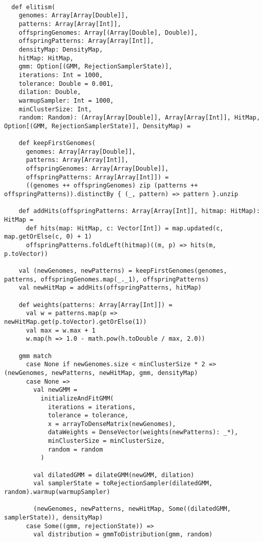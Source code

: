 \documentclass[10pt,a4paper]{article}
\theoremstyle{definition}
\theoremstyle{remark}
\begin{document}
\begin{lstlisting}[caption={Elitism function},label={lst:elitism}]

  def elitism(
    genomes: Array[Array[Double]],
    patterns: Array[Array[Int]],
    offspringGenomes: Array[(Array[Double], Double)],
    offspringPatterns: Array[Array[Int]],
    densityMap: DensityMap,
    hitMap: HitMap,
    gmm: Option[(GMM, RejectionSamplerState)],
    iterations: Int = 1000,
    tolerance: Double = 0.001,
    dilation: Double,
    warmupSampler: Int = 1000,
    minClusterSize: Int,
    random: Random): (Array[Array[Double]], Array[Array[Int]], HitMap, Option[(GMM, RejectionSamplerState)], DensityMap) =

    def keepFirstGenomes(
      genomes: Array[Array[Double]],
      patterns: Array[Array[Int]],
      offspringGenomes: Array[Array[Double]],
      offspringPatterns: Array[Array[Int]]) =
      ((genomes ++ offspringGenomes) zip (patterns ++ offspringPatterns)).distinctBy { (_, pattern) => pattern }.unzip

    def addHits(offspringPatterns: Array[Array[Int]], hitmap: HitMap): HitMap =
      def hits(map: HitMap, c: Vector[Int]) = map.updated(c, map.getOrElse(c, 0) + 1)
      offspringPatterns.foldLeft(hitmap)((m, p) => hits(m, p.toVector))

    val (newGenomes, newPatterns) = keepFirstGenomes(genomes, patterns, offspringGenomes.map(_._1), offspringPatterns)
    val newHitMap = addHits(offspringPatterns, hitMap)

    def weights(patterns: Array[Array[Int]]) =
      val w = patterns.map(p => newHitMap.get(p.toVector).getOrElse(1))
      val max = w.max + 1
      w.map(h => 1.0 - math.pow(h.toDouble / max, 2.0))

    gmm match
      case None if newGenomes.size < minClusterSize * 2 => (newGenomes, newPatterns, newHitMap, gmm, densityMap)
      case None =>
        val newGMM =
          initializeAndFitGMM(
            iterations = iterations,
            tolerance = tolerance,
            x = arrayToDenseMatrix(newGenomes),
            dataWeights = DenseVector(weights(newPatterns): _*),
            minClusterSize = minClusterSize,
            random = random
          )

        val dilatedGMM = dilateGMM(newGMM, dilation)
        val samplerState = toRejectionSampler(dilatedGMM, random).warmup(warmupSampler)

        (newGenomes, newPatterns, newHitMap, Some((dilatedGMM, samplerState)), densityMap)
      case Some((gmm, rejectionState)) =>
        val distribution = gmmToDistribution(gmm, random)


\end{lstlisting}
\end{document}
